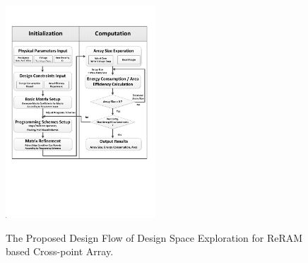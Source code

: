 \begin{figure}[!t]
\centering
  \includegraphics[width=0.5\textwidth]{./figures/FlowChart.pdf}\\
  \caption{The Proposed Design Flow of Design Space Exploration for ReRAM based Cross-point Array.}\label{fig:FlowChart}
\end{figure}

